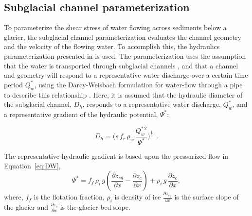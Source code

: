 \documentclass[11pt]{article}
\begin{document}
\begin{spacing}{1}
  \subsection{Subglacial channel  parameterization}
  \label{sect:sub_mode}
  To parameterize the shear stress of water flowing across sediments below a glacier, the subglacial channel parameterization evaluates the channel geometry and the velocity of the flowing water. 
  To accomplish this, the hydraulics parameterization presented in \citet{delaney2019} is used.
  The parameterization uses the assumption that the water is transported through subglacial channels \citep[Figure~\ref{fig:cartoon}; ][]{rothlisberger1972}, and that a channel and geometry will respond to a representative water discharge over a certain time period $Q_{w}^*$, using the Darcy-Weisbach formulation for water-flow through a pipe to describe this relationship \citep[e.g.][]{rothlisberger1972,clarke2003,werder2013}.
  Here, it is assumed that the hydraulic diameter of the subglacial channel, $D_h$, responds to a representative water discharge, $Q_{w}^*$, and a representative gradient of the hydraulic potential, $\Psi^*$:
  \begin{linenomath*}
    \begin{equation}
      \label{eq:DW}
      D_h = \big(s\, f_r\,\rho_w\, \frac{Q_w^{*\,2}}{\Psi^*}\big)^{\frac{1}{5}}~~.
    \end{equation}
  \end{linenomath*}
  The representative hydraulic gradient is based upon the pressurized flow in Equation~\ref{eq:DW},
  \begin{equation}
    \label{eq:psi}
    \Psi^*= f_f \,  \rho_i \, g (\frac{\partial  z_{sg}}{\partial x} - \frac{\partial z_c}{\partial x}) +  \rho_i \, g \, \frac{\partial z_c}{\partial x},
  \end{equation}
  \noindent
  where, $f_f$ is the flotation fraction, $\rho_i$ is density of ice $\frac{\partial z_{sg}}{\partial x}$ is the surface slope of the glacier and $\frac{\partial z_c}{\partial x}$ is the glacier bed slope.
  

\end{spacing}
\end{document}
